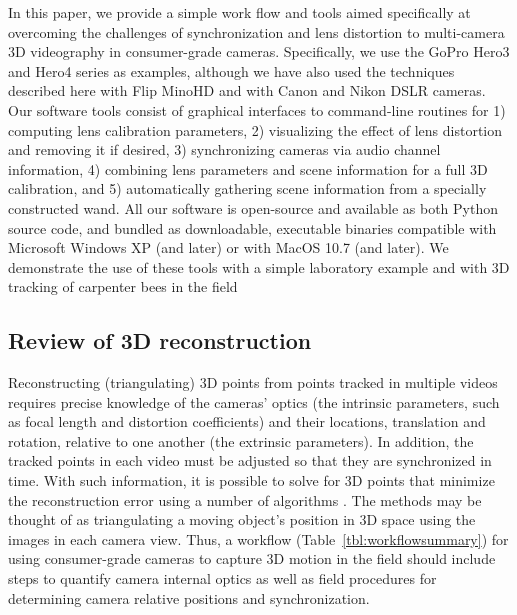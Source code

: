 \documentclass[fleqn,10pt]{wlpeerj}
\begin{document}
In this paper, we provide a simple work flow and tools aimed specifically at overcoming the challenges of synchronization and lens distortion to multi-camera 3D videography in consumer-grade cameras. Specifically, we use the GoPro Hero3 and Hero4 series as examples,  although we have also used the techniques described here with Flip MinoHD and with Canon and Nikon DSLR cameras.  Our software tools consist of graphical interfaces to command-line routines for 1) computing lens calibration parameters, 2) visualizing the effect of lens distortion and removing it if desired, 3) synchronizing cameras via audio channel information, 4) combining lens parameters and scene information for a full 3D calibration, and 5) automatically gathering scene information from a specially constructed wand. All our software is open-source and available as both Python source code, and bundled as downloadable, executable binaries compatible with Microsoft Windows XP (and later) or with MacOS 10.7 (and later). We demonstrate the use of these tools with a simple laboratory example and with 3D tracking of carpenter bees in the field   

\subsection*{Review of 3D reconstruction}

Reconstructing (triangulating) 3D points from points tracked in multiple videos requires precise knowledge of the cameras' optics (the intrinsic parameters, such as focal length and distortion coefficients) and their locations, translation and rotation, relative to one another (the extrinsic parameters).  In addition, the tracked points in each video must be adjusted so that they are synchronized in time.  With such information, it is possible to solve for 3D points that minimize the reconstruction error using a number of algorithms \citep{citations, Hedrick2008, bouguet2004camera,lour09,HartleyZisserman2000}.  The methods may be thought of as triangulating a moving object's position in 3D space using the images in each camera view.  Thus, a workflow (Table~\ref{tbl:workflowsummary}) for using consumer-grade cameras to capture 3D motion in the field should include steps to quantify camera internal optics as well as field procedures for determining camera relative positions and synchronization.    
\end{document}

